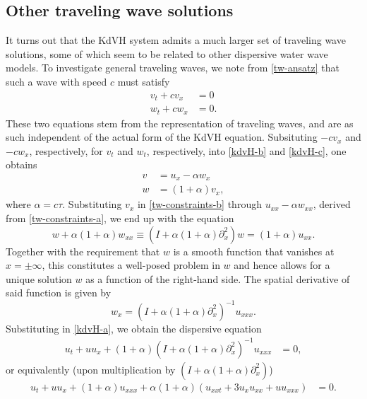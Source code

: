 \documentclass{article}
\newcommand{\ctau}{\alpha}
\begin{document}
\subsection{Other traveling wave solutions} \label{sec:other-tw}
It turns out that the KdVH system admits a much larger set of traveling
wave solutions, some of which seem to be related to other dispersive water wave models.
To investigate general traveling waves, we note from \eqref{tw-ansatz} that such a wave with speed $c$
must satisfy
\begin{align*}
    v_t + c v_x & = 0 \\
    w_t + c w_x & = 0.
\end{align*}
These two equations stem from the representation of traveling waves, and
are as such independent of the actual form of the KdVH equation. Subsituting
$-cv_x$ and $-cw_x$, respectively, for $v_t$ and $w_t$, respectively, into
\eqref{kdvH-b} and \eqref{kdvH-c}, one obtains 
\begin{subequations}
\label{tw-constraints}
\begin{align}
    v & = u_x - \ctau w_x   \label{tw-constraints-a}\\
    w & = (1+\ctau) v_x,    \label{tw-constraints-b}
\end{align}
\end{subequations}
where $\ctau = c \tau$.
Substituting $v_x$ in \eqref{tw-constraints-b} through $u_{xx} - \alpha w_{xx}$, derived from \eqref{tw-constraints-a}, we end up with the equation
\begin{equation}
 w+\alpha(1+\alpha) w_{xx} \equiv \left(I+\alpha(1+\alpha)\partial_x^2\right)w = (1+\alpha) u_{xx}.
\end{equation}
Together with the requirement that $w$ is a smooth function that vanishes at $x = \pm \infty$, this constitutes a well-posed problem in $w$ and hence allows for a unique solution $w$ as a function of the right-hand side. The spatial derivative of said function is given by
\begin{equation}
 w_x = \left(I + \alpha(1+\alpha)\partial_x^2\right)^{-1} u_{xxx}.
\end{equation}
Substituting in \eqref{kdvH-a}, we obtain the dispersive equation
\begin{align*}
    u_t + u u_x + (1+\ctau) (I + \ctau (1+ \alpha)\partial_x^2)^{-1} u_{xxx} & = 0,
\end{align*}
or equivalently (upon multiplication by $(I + \alpha(1+\alpha)\partial_x^2)$)
\begin{align} \label{DP-like}
    u_t + u u_x + (1+\ctau) u_{xxx} + \ctau (1+\ctau) (u_{xxt} + 3u_x u_{xx} + u u_{xxx}) & = 0.
\end{align}
\end{document}

